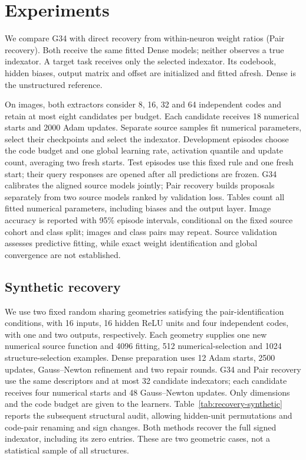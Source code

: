 \section{Experiments}
\label{sec:experiments}

We compare G34 with direct recovery from within-neuron weight ratios
(Pair recovery). Both receive the same fitted Dense models; neither
observes a true indexator. A target task receives only the selected
indexator. Its codebook, hidden biases, output matrix and offset are
initialized and fitted afresh. Dense is the unstructured reference.

On images, both extractors consider 8, 16, 32 and 64 independent codes
and retain at most eight candidates per budget. Each candidate receives
18 numerical starts and 2000 Adam updates. Separate source samples
fit numerical parameters, select their checkpoints and select the
indexator. Development episodes choose the code budget and one global
learning rate, activation quantile and update count, averaging two
fresh starts. Test episodes use this fixed rule and one fresh start;
their query responses are opened after all predictions are frozen.
G34 calibrates the aligned source models jointly; Pair recovery builds
proposals separately from two source models ranked by validation loss.
Tables count all fitted numerical parameters, including biases and
the output layer. Image accuracy is reported with 95\% episode intervals,
conditional on the fixed source cohort and class split; images and
class pairs may repeat. Source validation assesses predictive fitting,
while exact weight identification and global convergence are not established.

\subsection{Synthetic recovery}

We use two fixed random sharing geometries satisfying the pair-identification
conditions, with 16 inputs, 16 hidden
ReLU units and four independent codes, with one and two outputs,
respectively. Each geometry supplies one new numerical source function
and 4096 fitting, 512 numerical-selection and 1024 structure-selection
examples. Dense preparation uses 12 Adam starts, 2500 updates,
Gauss--Newton refinement and two repair rounds. G34 and Pair recovery
use the same descriptors and at most 32 candidate indexators; each
candidate receives four numerical starts and 48 Gauss--Newton updates.
Only dimensions and the code budget are given to the learners.
Table~\ref{tab:recovery-synthetic} reports the subsequent structural audit,
allowing hidden-unit permutations and code-pair renaming and sign changes.
Both methods recover the full signed indexator, including its zero entries.
These are two geometric cases, not a statistical sample of all structures.

